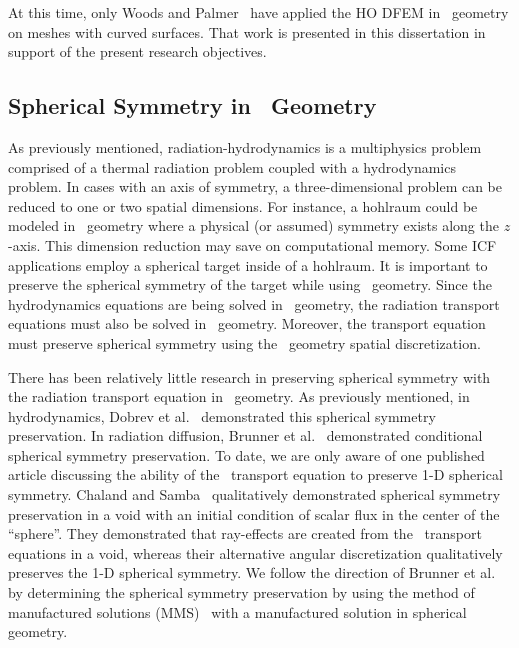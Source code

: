 \documentclass[12pt,letterpaper]{article}
\begin{document}
At this time, only Woods and Palmer~\cite{Woods2018RZJCTT} have applied the HO DFEM in \RZ\ geometry on meshes with curved surfaces. That work is presented in this dissertation in support of the present research objectives.

\subsection{Spherical Symmetry in \RZ\ Geometry}
\label{sec:SphericalSymmetryIntro}
As previously mentioned, radiation-hydrodynamics is a multiphysics problem comprised of a thermal radiation problem coupled with a hydrodynamics problem. In cases with an axis of symmetry, a three-dimensional problem can be reduced to one or two spatial dimensions. For instance, a hohlraum could be modeled in \RZ\ geometry where a physical (or assumed) symmetry exists along the $z$-axis. This dimension reduction may save on computational memory. Some ICF applications employ a spherical target inside of a hohlraum. It is important to preserve the spherical symmetry of the target while using \RZ\ geometry. Since the hydrodynamics equations are being solved in \RZ\ geometry, the radiation transport equations must also be solved in \RZ\ geometry. Moreover, the transport equation must preserve spherical symmetry using the \RZ\ geometry spatial discretization.

\begin{comment}
Despite the convenience of describing the analytical position within a sphere using spherical coordinates, the spatial discretization becomes much more complicated. It can be more convenient to solve a spherical problem using \RZ\ geometry because there are more angular derivatives in the streaming term of the radiation transport equation in spherical coordinates than in cylindrical. The increased complexity is analogous to the increased complexity of using \RZ\ geometry from Cartesian coordinates.
\end{comment}

There has been relatively little research in preserving spherical symmetry with the radiation transport equation in \RZ\ geometry. As previously mentioned, in hydrodynamics, Dobrev et al.~\cite{DobrevHOAxisymmetric} demonstrated this spherical symmetry preservation. In radiation diffusion, Brunner et al.~\cite{BrunnerSphericalsymmetry} demonstrated conditional spherical symmetry preservation. To date, we are only aware of one published article discussing the ability of the \RZ\ transport equation to preserve 1-D spherical symmetry. Chaland and Samba~\cite{Chaland2016SphericalSymmetry} qualitatively demonstrated spherical symmetry preservation in a void with an initial condition of scalar flux in the center of the ``sphere''. They demonstrated that ray-effects are created from the \SN\ transport equations in a void, whereas their alternative angular discretization qualitatively preserves the 1-D spherical symmetry. We follow the direction of Brunner et al.~\cite{BrunnerSphericalsymmetry} by determining the spherical symmetry preservation by using the method of manufactured solutions (MMS)~\cite{Lingus} with a manufactured solution in spherical geometry.
\end{document}
